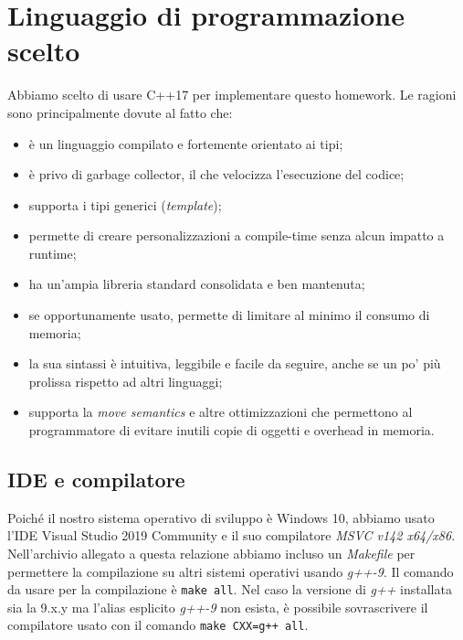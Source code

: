 \section{Linguaggio di programmazione scelto}
\label{cap:language-choice}

Abbiamo scelto di usare C++17 per implementare questo homework. Le ragioni sono principalmente dovute al fatto che:

\begin{itemize}
    \item è un linguaggio compilato e fortemente orientato ai tipi;
    \item è privo di garbage collector, il che velocizza l'esecuzione del codice;
    \item supporta i tipi generici (\textit{template});
    \item permette di creare personalizzazioni a compile-time senza alcun impatto a runtime;
    \item ha un'ampia libreria standard consolidata e ben mantenuta;
    \item se opportunamente usato, permette di limitare al minimo il consumo di memoria;
    \item la sua sintassi è intuitiva, leggibile e facile da seguire, anche se un po' più prolissa rispetto ad altri linguaggi;
    \item supporta la \textit{move semantics} e altre ottimizzazioni che permettono al programmatore di evitare inutili copie di oggetti e overhead in memoria.
\end{itemize}

\subsection{IDE e compilatore}

Poiché il nostro sistema operativo di sviluppo è Windows 10, abbiamo usato l'IDE Visual Studio 2019 Community e il suo compilatore \textit{MSVC v142 x64/x86}. \\

\noindent Nell'archivio allegato a questa relazione abbiamo incluso un \textit{Makefile} per permettere la compilazione su altri sistemi operativi usando \textit{g++-9}. Il comando da usare per la compilazione è \texttt{make all}. Nel caso la versione di \textit{g++} installata sia la 9.x.y ma l'alias esplicito \textit{g++-9} non esista, è possibile sovrascrivere il compilatore usato con il comando \texttt{make CXX=g++ all}.
